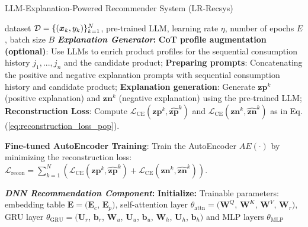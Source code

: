 \begin{algorithm}
\caption{LLM-Explanation-Powered Recommender System (LR-Recsys)}\label{algo:le_recsys}
\label{algo1}
\begin{algorithmic}[1]
   \REQUIRE dataset $\mathcal{D} = \{({\bm{x}}_k, y_k)\}_{k=1}^N$, pre-trained LLM, learning rate $\eta$, number of epochs $E$, batch size $B$
   \hspace*{-1.5\algorithmicindent} \textbf{\emph{Explanation Generator}:}
        \STATE \textbf{CoT profile augmentation (optional)}: Use LLMs to enrich product profiles for the sequential consumption history $j_1,...,j_n$ and the candidate product;
        \STATE \textbf{Preparing prompts}: Concatenating the positive and negative explanation prompts with sequential consumption history and candidate product; 
        \STATE \textbf{Explanation generation}: Generate $\bm{zp}^k$ (positive explanation) and $\bm{zn}^k$ (negative explanation) using the pre-trained LLM;
        \STATE \textbf{Reconstruction Loss}: Compute  $\mathcal{L}_{\text{CE}}(\bm{zp}^k, \hat{\bm{zp}}^k)$ and $\mathcal{L}_{\text{CE}}(\bm{zn}^k, \hat{\bm{zn}}^k) $ as in Eq.(\ref{eq:reconstruction_loss_pop}).
   \ENDFOR  

   \STATE \textbf{Fine-tuned AutoEncoder Training}: Train the AutoEncoder $AE(\cdot)$ by minimizing the reconstruction loss: $\mathcal{L}_{\text{recon}} = \sum_{k=1}^N \left(\mathcal{L}_{\text{CE}}(\bm{zp}^k, \hat{\bm{zp}}^k) + \mathcal{L}_{\text{CE}}(\bm{zn}^k, \hat{\bm{zn}}^k) \right) $. 

   \hspace*{-1.5\algorithmicindent} \textbf{\emph{DNN Recommendation Component}:}
   \STATE \textbf{Initialize:} Trainable parameters: embedding table $\mathbf{E} = (\mathbf{E}_{c}$, $\mathbf{E}_{p})$, self-attention layer $\theta_{\text{attn}} = (\mathbf{W}^Q$, $\mathbf{W}^K$, $\mathbf{W}^V$, $\mathbf{W}_r)$, GRU layer $\theta_{\text{GRU}} = (\mathbf{U}_r$, $\mathbf{b}_r$, $\mathbf{W}_u$, $\mathbf{U}_u$, $\mathbf{b}_u$, $\mathbf{W}_h$, $\mathbf{U}_h$, $\mathbf{b}_h)$ and MLP layers $\theta_{\text{MLP}}$
   

\end{algorithmic}
\end{algorithm}
